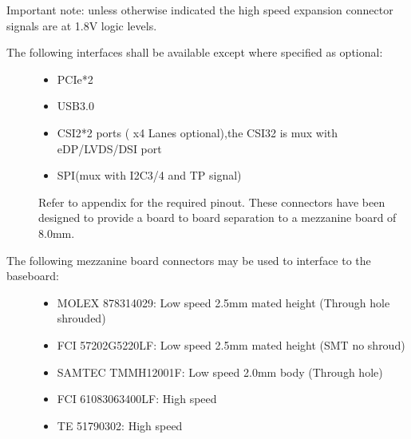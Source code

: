 \documentclass[a4paper,10pt,oneside,english]{sphinxmanual}
\begin{document}
\sphinxAtStartPar
Important note: unless otherwise indicated the high speed expansion connector signals are at 1.8V logic levels.
\begin{description}
\item[{The following interfaces shall be available except where specified as optional:}] \leavevmode\begin{itemize}
\item {} 
\sphinxAtStartPar
PCIe*2

\item {} 
\sphinxAtStartPar
USB3.0

\item {} 
\sphinxAtStartPar
CSI\sphinxhyphen{}2*2 ports ( x4 Lanes optional),the CSI3\sphinxhyphen{}2 is mux with eDP/LVDS/DSI port

\item {} 
\sphinxAtStartPar
SPI(mux with I2C3/4 and TP signal)

\end{itemize}

\sphinxAtStartPar
Refer to appendix for the required pinout. These connectors have been designed to provide a board to board separation to a mezzanine board of 8.0mm.

\end{description}

\sphinxAtStartPar
{}
\begin{description}
\item[{The following mezzanine board connectors may be used to interface to the baseboard:}] \leavevmode\begin{itemize}
\item {} 
\sphinxAtStartPar
MOLEX 87831\sphinxhyphen{}4029: Low speed 2.5mm mated height (Through hole shrouded)

\item {} 
\sphinxAtStartPar
FCI 57202\sphinxhyphen{}G52\sphinxhyphen{}20LF: Low speed 2.5mm mated height (SMT no shroud)

\item {} 
\sphinxAtStartPar
SAMTEC TMMH\sphinxhyphen{}120\sphinxhyphen{}01\sphinxhyphen{}F: Low speed 2.0mm body (Through hole)

\item {} 
\sphinxAtStartPar
FCI  61083\sphinxhyphen{}063400LF: High speed

\item {} 
\sphinxAtStartPar
TE 5179030\sphinxhyphen{}2: High speed

\end{itemize}

\end{description}
\end{document}
